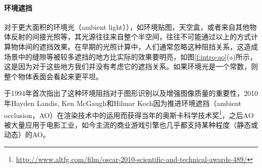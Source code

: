 \paragraph{环境遮挡}
对于更大面积的环境光（ambient light）），如环境贴图，天空盒，或者来自其他物体反射的间接光照等，其光源往往来自整个半空间，往往不可能通过以上的方式计算物体间的遮挡效果。在早期的光照计算中，人们通常忽略这种阻挡关系，这造成场景中的缝隙等被较多遮挡的地方比实际的效果要明亮，如图\ref{f:intro-ao}(a)所示，这是因为对于这些地方我们并没有考虑它的遮挡关系。如果环境光是一个常数，则整个物体表面会看起来更平坦。

\cite{a:Shape-from-shadingonacloudyday}于1994年首次指出了这种环境阻挡对于图形识别以及增强图像质量的重要性，2010年Hayden Landis, Ken McGaugh和Hilmar Koch因为推进环境遮挡（ambient occlusion，AO）在渲染技术中的运用而获得当年的奥斯卡科学技术奖\footnote{\url{http://www.altfg.com/film/oscar-2010-scientific-and-technical-awards-489/}}，之后AO被大量应用于电影工业，如今主流的商业游戏引擎也几乎都支持某种程度（静态或动态）的AO。

